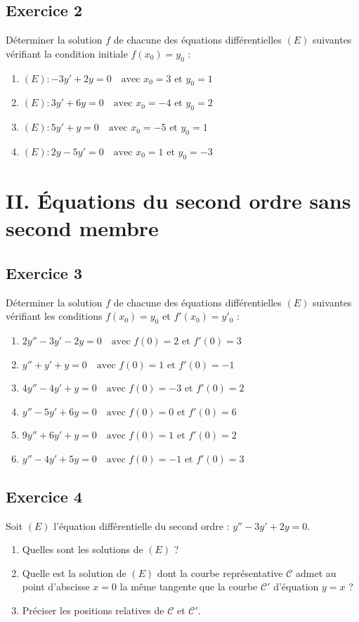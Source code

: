 \documentclass[12pt,a4paper]{article}
\begin{document}
\subsection*{Exercice 2}
Déterminer la solution $f$ de chacune des équations différentielles $(E)$ suivantes vérifiant la condition initiale $f(x_{0}) = y_{0}$ :
\begin{enumerate}[label=\arabic*)]
    \item $(E) : -3y' + 2y = 0 \quad \text{avec } x_{0} = 3 \text{ et } y_{0} = 1$
    \item $(E) : 3y' + 6y = 0 \quad \text{avec } x_{0} = -4 \text{ et } y_{0} = 2$
    \item $(E) : 5y' + y = 0 \quad \text{avec } x_{0} = -5 \text{ et } y_{0} = 1$
    \item $(E) : 2y - 5y' = 0 \quad \text{avec } x_{0} = 1 \text{ et } y_{0} = -3$
\end{enumerate}


\section*{II. Équations du second ordre sans second membre}

\subsection*{Exercice 3}
Déterminer la solution $f$ de chacune des équations différentielles $(E)$ suivantes vérifiant les conditions $f(x_{0}) = y_{0}$ et $f'(x_{0}) = y'_{0}$ :
\begin{enumerate}[label=\arabic*)]
    \item $2y'' - 3y' - 2y = 0 \quad \text{avec } f(0) = 2 \text{ et } f'(0) = 3$
    \item $y'' + y' + y = 0 \quad \text{avec } f(0) = 1 \text{ et } f'(0) = -1$
    \item $4y'' - 4y' + y = 0 \quad \text{avec } f(0) = -3 \text{ et } f'(0) = 2$
    \item $y'' - 5y' + 6y = 0 \quad \text{avec } f(0) = 0 \text{ et } f'(0) = 6$
    \item $9y'' + 6y' + y = 0 \quad \text{avec } f(0) = 1 \text{ et } f'(0) = 2$
    \item $y'' - 4y' + 5y = 0 \quad \text{avec } f(0) = -1 \text{ et } f'(0) = 3$
\end{enumerate}

\subsection*{Exercice 4}
Soit $(E)$ l'équation différentielle du second ordre : $y'' - 3y' + 2y = 0.$
\begin{enumerate}[label=\alph*)]
    \item Quelles sont les solutions de $(E)$ ?
    \item Quelle est la solution de $(E)$ dont la courbe représentative $\mathcal{C}$ admet au point d'abscisse $x=0$ la même tangente que la courbe $\mathcal{C'}$ d'équation $y=x$ ?
    \item Préciser les positions relatives de $\mathcal{C}$ et $\mathcal{C'}$.
\end{enumerate}
\end{document}
